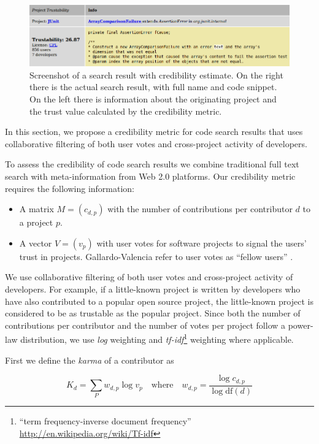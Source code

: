 \documentclass[10pt]{book}
\begin{document}
\begin{figure}
  \centering
  	 \includegraphics[width=\linewidth]{bender-screenshot}
    \caption{
    {\small
    Screenshot of a \Jbd search result with credibility estimate. On the right there is the actual search result, with full name and code snippet. On the left there is information about the originating project and the trust value calculated by the credibility metric.
    }
    }
    \label{fig:screenshot}
\end{figure}

In this section, we propose a credibility metric for code search results that uses collaborative filtering of both user votes and cross-project activity of developers.

To assess the credibility of code search results we combine traditional full text search with meta-information from Web 2.0 platforms. Our credibility metric requires the following information:

\begin{itemize}
\item A matrix $M = (c_{d,p})$ with the number of contributions per contributor $d$ to a project $p$.
\item A vector $V = (v_p)$ with user votes for software projects to signal the users' trust in projects. Gallardo-Valencia \etal refer to user votes as ``fellow users'' \cite{Gall09a}.
\end{itemize}

We use collaborative filtering of both user votes and cross-project activity of developers. For example, if a little-known project is written by developers who have also contributed to a popular open source project, the little-known project is considered to be as trustable as the popular project. Since both the number of contributions per contributor and the number of votes per project follow a power-law distribution, we use \emph{log} weighting and \emph{tf-idf}\footnote{``term frequency-inverse document frequency'' \url{http://en.wikipedia.org/wiki/Tf-idf}} weighting where applicable. 

First we define the \emph{karma} of a contributor as

    $$K_{d} = \sum_{P} w_{d,p} \log v_p
    \quad \mathrm{where} \quad 
    w_{d,p} = \frac{\log c_{d,p}}{\log \mathrm{df}(d)}$$
\end{document}
